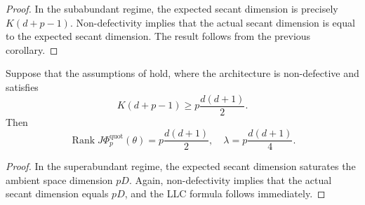\begin{proof}
    In the subabundant regime, the expected secant dimension is precisely $K(d+p-1)$.
    Non-defectivity implies that the actual secant dimension is equal to the expected secant dimension.
    The result follows from the previous corollary.
\end{proof}

\begin{corollary}
    Suppose that the assumptions of  hold, where the architecture is non-defective and satisfies
    \begin{equation}
        K(d+p-1) \geq p \frac{d(d+1)}{2}.
    \end{equation}
    Then
    \begin{equation}
        \operatorname{Rank} J \Phi_{p}^{\operatorname{quot}}(\theta) = p\frac{d(d+1)}{2}, \quad \lambda = p\frac{d(d+1)}{4}.
    \end{equation}    
\end{corollary}

\begin{proof}
    In the superabundant regime, the expected secant dimension saturates the ambient space dimension $pD$.
    Again, non-defectivity implies that the actual secant dimension equals $pD$, and the LLC formula follows immediately.
\end{proof}

